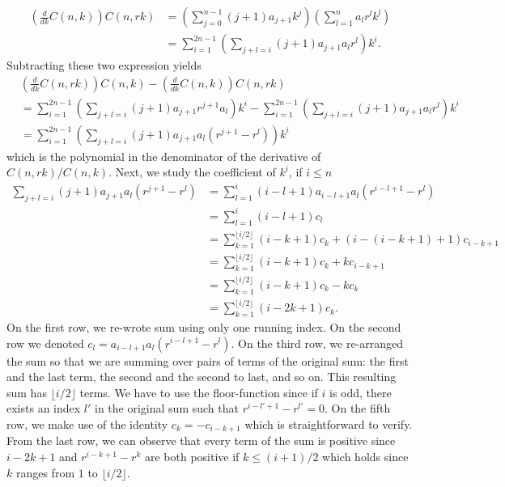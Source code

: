 \documentclass[12pt]{article}
\newcommand{\Le}{\left(}
\newcommand{\Ri}{\right)}
\begin{document}
\begin{align*}
\Le\frac{d}{dk}C(n,k)\Ri C(n,rk) &= \Le \sum_{j=0}^{n-1}(j+1)a_{j+1}k^{j} \Ri \Le \sum_{l=1}^{n} a_l  r^lk^l  \Ri \\
&= \sum_{i = 1}^{2n-1} \Le \sum_{j+l = i}(j+1)a_{j+1}a_l  r^l   \Ri k^i.
\end{align*}
Subtracting these two expression yields
\begin{align*}
&\Le\frac{d}{dk}C(n,rk)\Ri C(n,k)-\Le\frac{d}{dk}C(n,k)\Ri C(n,rk) \\&= \sum_{i = 1}^{2n-1} \Le \sum_{j+l = i} (j+1)a_{j+1}r^{j+1}a_l  \Ri k^i - \sum_{i = 1}^{2n-1} \Le \sum_{j+l = i}(j+1)a_{j+1}a_l  r^l   \Ri k^i \\
&= \sum_{i = 1}^{2n-1} \Le \sum_{j+l = i}(j+1)a_{j+1}a_l  (r^{j+1}- r^l)   \Ri k^i
\end{align*}which is the polynomial in the denominator of the derivative of $C(n,rk)/C(n,k)$.
Next, we study the coefficient of $k^i$, if $i \leq n$
\begin{align*}
\sum_{j+l = i}(j+1)a_{j+1}a_l  (r^{j+1}- r^l) &= \sum_{l=1}^{i}(i-l+1)a_{i-l+1}a_l  (r^{i-l+1}- r^l) \\
& = \sum_{l=1}^{i}(i-l+1)c_l \\
&= \sum_{k =1}^{\lfloor i / 2 \rfloor}(i-k+1)c_k + (i-(i-k + 1)+1)c_{i-k+1} \\
&=  \sum_{k =1}^{\lfloor i / 2 \rfloor}(i-k+1)c_k + kc_{i-k+1} \\
&=  \sum_{k =1}^{\lfloor i / 2 \rfloor}(i-k+1)c_k - kc_{k} \\
&= \sum_{k =1}^{\lfloor i / 2 \rfloor}(i-2k+1)c_k.
\end{align*} On the first row, we re-wrote sum using only one running index. On the second row we denoted $c_l =a_{i-l+1}a_l  (r^{i-l+1}- r^l)$. On the third row, we re-arranged the sum so that we are summing over pairs of terms of the original sum: the first and the last term, the second and the second to last, and so on.  This resulting sum has $\lfloor i / 2 \rfloor$ terms. We have to use the floor-function since if $i$ is odd, there exists an index $l'$ in the original sum such that $r^{i-l'+1}-r^{l'} = 0$. On the fifth row, we make use of the identity $c_k = -c_{i-k+1}$ which is straightforward to verify. From the last row, we can observe that every term of the sum is positive since $i-2k+1$ and $r^{i-k+1}- r^k$ are both positive if $k \leq (i+1)/2$ which holds since $k$ ranges from $1$ to $\lfloor i / 2 \rfloor$.
\end{document}

